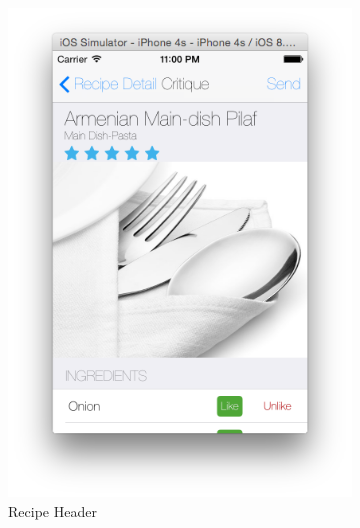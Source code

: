 	  \begin{figure}[h]
	  	\begin{subfigure}{.32\textwidth}
	  		\includegraphics[width=.9\linewidth]{figures/ch4_app_screen_shots/critique/critique_1.png}
	  		\caption{Recipe Header}
	  	\end{subfigure}
	  	\begin{subfigure}{.32\textwidth}

\end{subfigure}
\end{figure}
